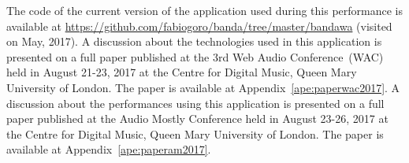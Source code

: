 The code of the current version of the application used during this performance is available at \url{https://github.com/fabiogoro/banda/tree/master/bandawa} (visited on May, 2017).
A discussion about the technologies used in this application is presented on a full paper published at the 3rd Web Audio Conference~(WAC) held in August 21-23, 2017 at the Centre for Digital Music, Queen Mary University of London.
The paper is available at Appendix~\ref{ape:paperwac2017}.
A discussion about the performances using this application is presented on a full paper published at the Audio Mostly Conference held in August 23-26, 2017 at the Centre for Digital Music, Queen Mary University of London.
The paper is available at Appendix~\ref{ape:paperam2017}.